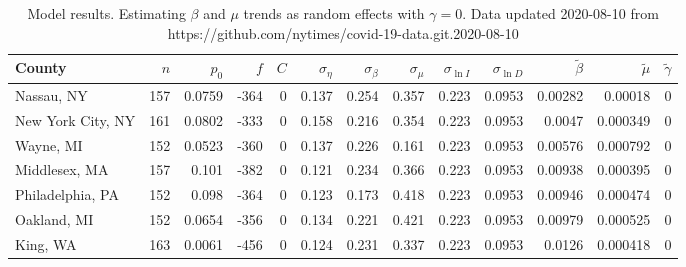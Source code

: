 \documentclass[12pt,letterpaper]{article}
\begin{document}
% 

\begin{sidewaystable}
\caption{
Model results. Estimating $\beta$ and $\mu$ trends as random effects
with $\gamma = 0$.
Data updated 2020-08-10 from https://github.com/nytimes/covid-19-data.git.2020-08-10
}
\centering
{\small

\begin{tabular}{lrrrrrrrrrrrr}
\hline
 County             &   $n$ &   $p_0$ &    $f$ &   $C$ &   $\sigma_\eta$ &   $\sigma_\beta$ &   $\sigma_\mu$ &   $\sigma_{\ln I}$ &   $\sigma_{\ln D}$ &   $\tilde{\beta}$ &   $\tilde{\mu}$ &   $\tilde\gamma$ \\
\hline
 Nassau, NY         & 157   & 0.0759  & -364   &     0 &         0.137   &           0.254  &         0.357  &              0.223 &             0.0953 &           0.00282 &        0.00018  &                0 \\
 New York City, NY  & 161   & 0.0802  & -333   &     0 &         0.158   &           0.216  &         0.354  &              0.223 &             0.0953 &           0.0047  &        0.000349 &                0 \\
 Wayne, MI          & 152   & 0.0523  & -360   &     0 &         0.137   &           0.226  &         0.161  &              0.223 &             0.0953 &           0.00576 &        0.000792 &                0 \\
 Middlesex, MA      & 157   & 0.101   & -382   &     0 &         0.121   &           0.234  &         0.366  &              0.223 &             0.0953 &           0.00938 &        0.000395 &                0 \\
 Philadelphia, PA   & 152   & 0.098   & -364   &     0 &         0.123   &           0.173  &         0.418  &              0.223 &             0.0953 &           0.00946 &        0.000474 &                0 \\
 Oakland, MI        & 152   & 0.0654  & -356   &     0 &         0.134   &           0.221  &         0.421  &              0.223 &             0.0953 &           0.00979 &        0.000525 &                0 \\
 King, WA           & 163   & 0.0061  & -456   &     0 &         0.124   &           0.231  &         0.337  &              0.223 &             0.0953 &           0.0126  &        0.000418 &                0 \\

\end{tabular}}
\end{sidewaystable}
\end{document}
